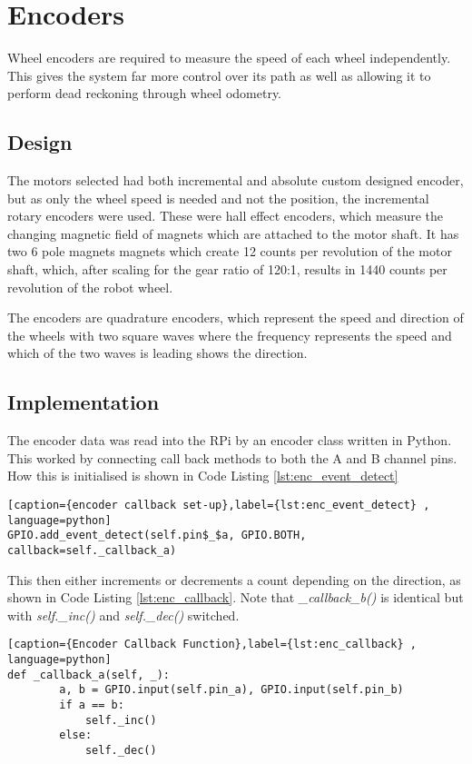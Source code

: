 \section{Encoders}\label{elec/encoder}
Wheel encoders are required to measure the speed of each wheel
independently. This gives the system far more control over its path
as well as allowing it to perform dead reckoning through wheel odometry.

\subsection{Design}\label{elec/encoder/design}
The motors selected had both incremental and absolute custom designed
encoder, but as only the wheel speed is needed and not the position,
the incremental rotary encoders were used. These were hall effect
encoders, which measure the changing magnetic field of magnets which
are attached to the motor shaft. It has two 6 pole magnets magnets
which create 12 counts per revolution of the motor shaft, which, after
scaling for the gear ratio of 120:1, results in 1440 counts per
revolution of the robot wheel.

The encoders are quadrature encoders, which represent the speed and
direction of the wheels with two square waves where the frequency
represents the speed and which of the two waves is leading shows the
direction.

\subsection{Implementation}\label{elec/encoder/impl}

The encoder data was read into the RPi by an encoder class written in
Python. This worked by connecting call back methods to both the A and B
channel pins. How this is initialised is shown in Code Listing
\ref{lst:enc_event_detect}

\begin{lstlisting}[caption={encoder callback set-up},label={lst:enc_event_detect} , language=python]
GPIO.add_event_detect(self.pin$_$a, GPIO.BOTH, callback=self._callback_a)
\end{lstlisting}

This then either increments or decrements a count depending on the
direction, as shown in Code Listing \ref{lst:enc_callback}. Note that
\textit{\_callback\_b()} is identical but with \textit{self.\_inc()} and
\textit{self.\_dec()} switched.

\begin{lstlisting}[caption={Encoder Callback Function},label={lst:enc_callback} , language=python]
def _callback_a(self, _):
        a, b = GPIO.input(self.pin_a), GPIO.input(self.pin_b)
        if a == b:
            self._inc()
        else:
            self._dec()
\end{lstlisting}


